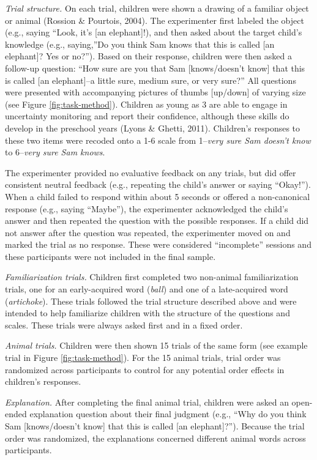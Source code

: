 \documentclass[10pt, letterpaper]{article}
\begin{document}
\emph{Trial structure.} On each trial, children were shown a drawing of
a familiar object or animal (Rossion \& Pourtois, 2004). The
experimenter first labeled the object (e.g., saying ``Look, it's {[}an
elephant{]}!), and then asked about the target child's knowledge (e.g.,
saying,''Do you think Sam knows that this is called {[}an elephant{]}?
Yes or no?''). Based on their response, children were then asked a
follow-up question: ``How sure are you that Sam {[}knows/doesn't know{]}
that this is called {[}an elephant{]}--a little sure, medium sure, or
very sure?'' All questions were presented with accompanying pictures of
thumbs {[}up/down{]} of varying size (see Figure \ref{fig:task-method}).
Children as young as 3 are able to engage in uncertainty monitoring and
report their confidence, although these skills do develop in the
preschool years (Lyons \& Ghetti, 2011). Children's responses to these
two items were recoded onto a 1-6 scale from 1--\emph{very sure Sam
doesn't know} to 6--\emph{very sure Sam knows}.

The experimenter provided no evaluative feedback on any trials, but did
offer consistent neutral feedback (e.g., repeating the child's answer or
saying ``Okay!''). When a child failed to respond within about 5 seconds
or offered a non-canonical response (e.g., saying ``Maybe''), the
experimenter acknowledged the child's answer and then repeated the
question with the possible responses. If a child did not answer after
the question was repeated, the experimenter moved on and marked the
trial as no response. These were considered ``incomplete'' sessions and
these participants were not included in the final sample.

\emph{Familiarization trials.} Children first completed two non-animal
familiarization trials, one for an early-acquired word (\emph{ball}) and
one of a late-acquired word (\emph{artichoke}). These trials followed
the trial structure described above and were intended to help
familiarize children with the structure of the questions and scales.
These trials were always asked first and in a fixed order.

\emph{Animal trials.} Children were then shown 15 trials of the same
form (see example trial in Figure \ref{fig:task-method}). For the 15
animal trials, trial order was randomized across participants to control
for any potential order effects in children's responses.

\emph{Explanation.} After completing the final animal trial, children
were asked an open-ended explanation question about their final judgment
(e.g., ``Why do you think Sam {[}knows/doesn't know{]} that this is
called {[}an elephant{]}?''). Because the trial order was randomized,
the explanations concerned different animal words across participants.
\end{document}
